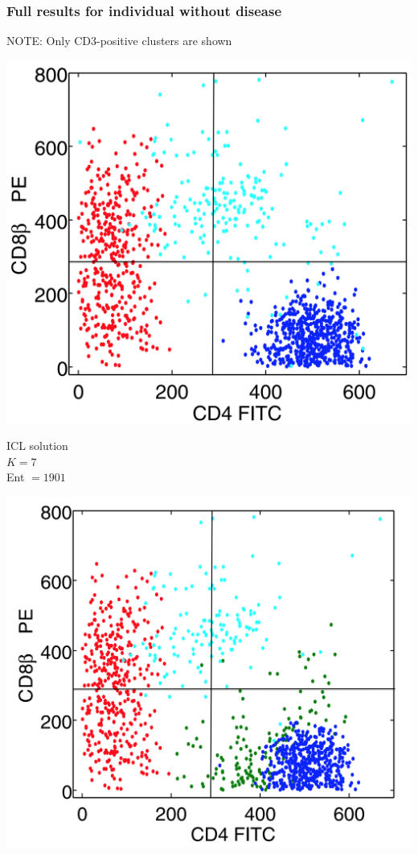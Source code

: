 \documentclass[mathserif,compress]{beamer}
\renewcommand\;{\,}
\begin{document}
\begin{frame}\frametitle{Full results for individual without disease}
\alert{NOTE}: Only CD3-positive clusters are shown
\begin{center}
\begin{minipage}{0.3\linewidth}
\includegraphics[width=\linewidth]{ICL_control.png}
\begin{center}
ICL solution
\\
$K = 7$
\\
Ent $= 1901$
\end{center}
\end{minipage}
\hfill
\begin{minipage}{0.3\linewidth}
\includegraphics[width=\linewidth]{BIC_control.png}

\end{minipage}
\end{center}
\end{frame}
\end{document}
